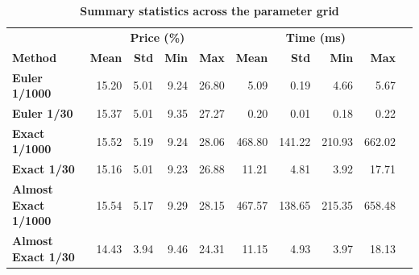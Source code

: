 \documentclass{article}
\begin{document}
\begin{table}[htbp]
\centering
\caption{\textbf{Summary statistics across the parameter grid}}
\vspace{0.4em}
\begin{tabular}{lrrrrrrrrr}
\hline
 & \multicolumn{4}{c}{\textbf{Price (\%)}} & \multicolumn{4}{c}{\textbf{Time (ms)}} \\
\textbf{Method} & \textbf{Mean} & \textbf{Std} & \textbf{Min} & \textbf{Max} & \textbf{Mean} & \textbf{Std} & \textbf{Min} & \textbf{Max} \\
\hline
\textbf{Euler 1/1000} & 15.20 & 5.01 & 9.24 & 26.80 & 5.09 & 0.19 & 4.66 & 5.67 \\
\textbf{Euler 1/30} & 15.37 & 5.01 & 9.35 & 27.27 & 0.20 & 0.01 & 0.18 & 0.22 \\
\textbf{Exact 1/1000} & 15.52 & 5.19 & 9.24 & 28.06 & 468.80 & 141.22 & 210.93 & 662.02 \\
\textbf{Exact 1/30} & 15.16 & 5.01 & 9.23 & 26.88 & 11.21 & 4.81 & 3.92 & 17.71 \\
\textbf{Almost Exact 1/1000} & 15.54 & 5.17 & 9.29 & 28.15 & 467.57 & 138.65 & 215.35 & 658.48 \\
\textbf{Almost Exact 1/30} & 14.43 & 3.94 & 9.46 & 24.31 & 11.15 & 4.93 & 3.97 & 18.13 \\
\hline
\end{tabular}
\end{table}
\end{document}
